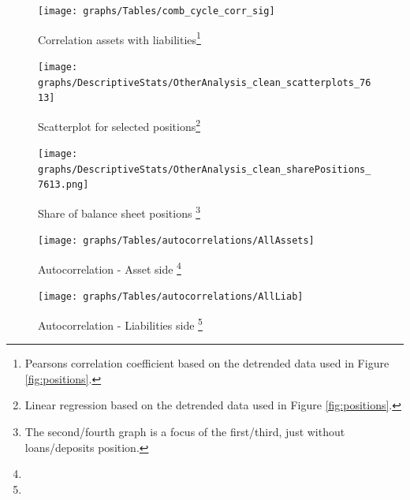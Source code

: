 \documentclass[12pt, a4paper]{article} %
\begin{document}
\begin{figure}[hbtp]
\begin{minipage}{\textwidth}

\centering
\caption[1]{Correlation assets with liabilities\footnote{Pearsons correlation coefficient based on the detrended data used in Figure \ref{fig:positions}.} }
\texttt{[image: graphs/Tables/comb\_cycle\_corr\_sig]}
\label{fig:corr_comb}

\end{minipage}
\end{figure}


\begin{figure}[hbtp]
\begin{minipage}{\textwidth}

\centering
\caption[1]{Scatterplot for selected positions\footnote{Linear regression based on the detrended data used in Figure \ref{fig:positions}.} }
\texttt{[image: graphs/DescriptiveStats/OtherAnalysis\_clean\_scatterplots\_7613]}
\label{fig:scatterplots}

\end{minipage}
\end{figure}


\begin{figure}[hbtp]
\begin{minipage}{\textwidth}

\centering
\caption[1]{Share of balance sheet positions \footnote{The second/fourth graph is a focus of the first/third, just without loans/deposits position.} }
\texttt{[image: graphs/DescriptiveStats/OtherAnalysis\_clean\_sharePositions\_7613.png]}
\label{fig:share_both}

\end{minipage}
\end{figure}



\begin{figure}[hbtp]
\begin{minipage}{\textwidth}

\centering
\caption[1]{Autocorrelation - Asset side \footnote{} }
\texttt{[image: graphs/Tables/autocorrelations/AllAssets]}
\label{fig:share_both}

\end{minipage}
\end{figure}

\begin{figure}[hbtp]
\begin{minipage}{\textwidth}

\centering
\caption[1]{Autocorrelation - Liabilities side \footnote{} }
\texttt{[image: graphs/Tables/autocorrelations/AllLiab]}
\label{fig:share_both}

\end{minipage}
\end{figure}
\end{document}
